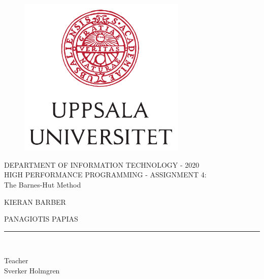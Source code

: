 \begin{titlepage}
  \begin{center}
      \vspace*{-1in}
      \begin{figure}[htb]
          \begin{center}
              \includegraphics[width=8cm]{../images/UU_logo.jpg}
          \end{center}
      \end{figure}

      DEPARTMENT OF INFORMATION TECHNOLOGY - 2020\\
      \vspace*{0.15in}
      HIGH PERFORMANCE PROGRAMMING - ASSIGNMENT 4:\\The Barnes-Hut Method \\
      \vspace*{0.3in}
      \begin{large}
          KIERAN BARBER\\
      \end{large}
      \vspace*{0.1in}
      \begin{Large}
          PANAGIOTIS PAPIAS\\
      \end{Large}
      \vspace*{0.1in}
      \rule{80mm}{0.1mm}\\
      \vspace*{0.1in}
      \begin{large}
          Teacher \\
          Sverker Holmgren
      \end{large}
  \end{center}
\end{titlepage}
